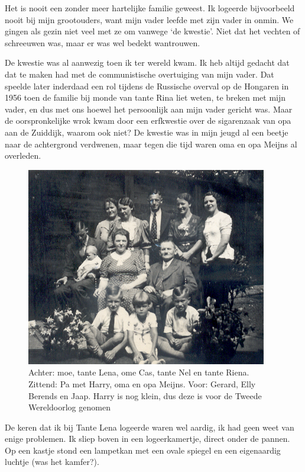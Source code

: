 \documentclass[12pt,twoside, openright]{memoir}
\begin{document}
Het is nooit een zonder meer hartelijke familie geweest. Ik logeerde bijvoorbeeld nooit bij mijn grootouders, want mijn vader leefde met zijn vader in onmin. We gingen als gezin niet veel met ze om vanwege `de kwestie'. Niet dat het vechten of schreeuwen was, maar er was wel bedekt wantrouwen.

De kwestie was al aanwezig toen ik ter wereld kwam. Ik heb altijd gedacht dat dat te maken had met de communistische overtuiging van mijn vader. Dat speelde later inderdaad een rol tijdens de Russische overval op de Hongaren in 1956 toen de familie bij monde van tante Rina liet weten, te breken met mijn vader, en dus met ons hoewel het persoonlijk aan mijn vader gericht was. Maar de oorspronkelijke wrok kwam door een erfkwestie over de sigarenzaak van opa aan de Zuiddijk, waarom ook niet? De kwestie was in mijn jeugd al een beetje naar de achtergrond verdwenen, maar tegen die tijd waren oma en opa Meijns al overleden.

\begin{figure}
\centering
\includegraphics[width=\textwidth]{img/ch1/famMeijns2}
\caption*{\footnotesize Achter: moe, tante Lena, ome Cas, tante Nel en tante Riena. Zittend: Pa met Harry, oma en opa Meijns. Voor: Gerard, Elly Berends en Jaap. Harry is nog klein, dus deze is voor de Tweede Wereldoorlog genomen}
\end{figure}

De keren dat ik bij Tante Lena logeerde waren wel aardig, ik had geen weet van enige problemen. Ik sliep boven in een logeerkamertje, direct onder de pannen. Op een kastje stond een lampetkan met een ovale spiegel en een eigenaardig luchtje (was het kamfer?). 
\end{document}
